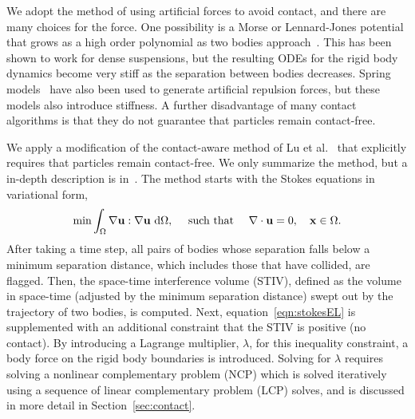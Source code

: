 \documentclass[preprint, 10pt]{elsarticle}
\begin{document}


We adopt the method of using artificial forces to avoid contact, and
there are many choices for the force. One possibility is a Morse or
Lennard-Jones potential that grows as a high order polynomial as two
bodies approach~\cite{Flormann2017, Liu2006}. This has been shown to
work for dense suspensions, but the resulting ODEs for the rigid body
dynamics become very stiff as the separation between bodies decreases.
Spring models~\cite{Tsubota2006, Zhao2013, Kabacogulu2017} have also
been used to generate artificial repulsion forces, but these models also
introduce stiffness. A further disadvantage of many contact algorithms
is that they do not guarantee that particles remain contact-free.

We apply a modification of the contact-aware method of Lu et
al.~\cite{Lu2017} that explicitly requires that particles remain
contact-free. We only summarize the method, but a
in-depth description is in~\cite{Lu2017}.  The method starts with the
Stokes equations in variational form,
\begin{align}
  \min \int_{\Omega} \nabla{\mathbf{u}}:\nabla{\mathbf{u}}~\text{d}\Omega,
  \quad\text{ such that }\quad \nabla\cdot{\mathbf{u}} = 0, 
  \quad {\mathbf{x}} \in \Omega.
  \label{eqn:stokesEL}
\end{align} 
After taking a time step, all pairs of bodies whose separation falls
below a minimum separation distance, which includes those that have
collided, are flagged.  Then, the space-time interference volume (STIV),
defined as the volume in space-time (adjusted by the minimum separation
distance) swept out by the trajectory of two bodies, is computed.  Next,
equation~\eqref{eqn:stokesEL} is supplemented with an additional
constraint that the STIV is positive (no contact).  By introducing a
Lagrange multiplier, $\lambda$, for this inequality constraint, a body
force on the rigid body boundaries is introduced.   Solving for $\lambda$
requires solving a nonlinear complementary problem (NCP) which is solved
iteratively using a sequence of linear complementary problem (LCP)
solves, and is discussed in more detail in Section~\ref{sec:contact}.
\end{document}
